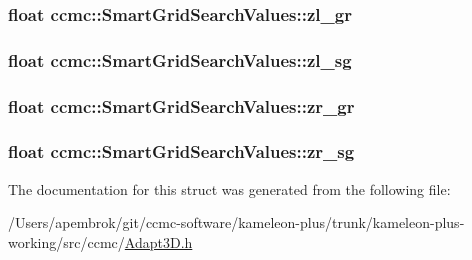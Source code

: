 \hypertarget{structccmc_1_1_smart_grid_search_values_a48282880363f71c4808e1c52b02b3f15}{
\subsubsection[{zl\-\_\-gr}]{\setlength{\rightskip}{0pt plus 5cm}float ccmc\-::\-Smart\-Grid\-Search\-Values\-::zl\-\_\-gr}}\label{structccmc_1_1_smart_grid_search_values_a48282880363f71c4808e1c52b02b3f15}
\hypertarget{structccmc_1_1_smart_grid_search_values_a5fb89265acfd6f65e95d71ae9ddc8a96}{
\subsubsection[{zl\-\_\-sg}]{\setlength{\rightskip}{0pt plus 5cm}float ccmc\-::\-Smart\-Grid\-Search\-Values\-::zl\-\_\-sg}}\label{structccmc_1_1_smart_grid_search_values_a5fb89265acfd6f65e95d71ae9ddc8a96}
\hypertarget{structccmc_1_1_smart_grid_search_values_a8b574711e03c10b054ce85b65123349b}{
\subsubsection[{zr\-\_\-gr}]{\setlength{\rightskip}{0pt plus 5cm}float ccmc\-::\-Smart\-Grid\-Search\-Values\-::zr\-\_\-gr}}\label{structccmc_1_1_smart_grid_search_values_a8b574711e03c10b054ce85b65123349b}
\hypertarget{structccmc_1_1_smart_grid_search_values_aafc8fc1c1fbadae14f2a921f14853189}{
\subsubsection[{zr\-\_\-sg}]{\setlength{\rightskip}{0pt plus 5cm}float ccmc\-::\-Smart\-Grid\-Search\-Values\-::zr\-\_\-sg}}\label{structccmc_1_1_smart_grid_search_values_aafc8fc1c1fbadae14f2a921f14853189}


The documentation for this struct was generated from the following file\-:\begin{DoxyCompactItemize}
\item 
/\-Users/apembrok/git/ccmc-\/software/kameleon-\/plus/trunk/kameleon-\/plus-\/working/src/ccmc/\hyperlink{_adapt3_d_8h}{Adapt3\-D.\-h}\end{DoxyCompactItemize}
